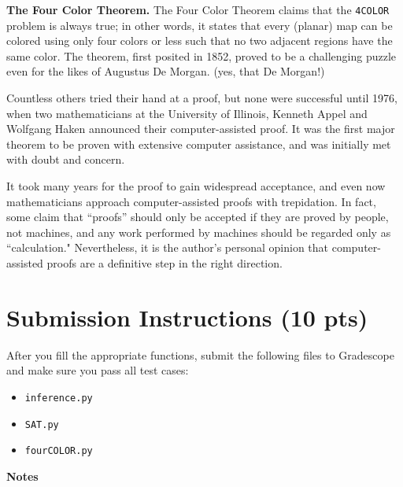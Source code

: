 \documentclass{article}
\begin{document}
    \begin{tcolorbox}[colback=green!10, phantom=\phantomsection\hypertarget{fct}]

        \textbf{The Four Color Theorem.}
        The Four Color Theorem claims that the \lstinline{4COLOR} problem is always true; in other words, it states that every (planar) map can be colored using only four colors or less such that no two adjacent regions have the same color. The theorem, first posited in 1852, proved to be a challenging puzzle even for the likes of Augustus De Morgan. (yes, that De Morgan!)

        \vspace{3mm}
        Countless others tried their hand at a proof, but none were successful until 1976, when two mathematicians at the University of Illinois, Kenneth Appel and Wolfgang Haken announced their computer-assisted proof.  It was the first major theorem to be proven with extensive computer assistance, and was initially met with doubt and concern.

        \vspace{3mm}
        It took many years for the proof to gain widespread acceptance, and even now mathematicians approach computer-assisted proofs with trepidation. In fact, some claim that ``proofs” should only be accepted if they are proved by people, not machines, and any work performed by machines should be regarded only as ``calculation." Nevertheless, it is the author's personal opinion that computer-assisted proofs are a definitive step in the right direction.
    \end{tcolorbox}

\section*{Submission Instructions (10 pts)}
    After you fill the appropriate functions, submit the following files to Gradescope and make sure you pass all test cases:
    \begin{itemize}
        \item \lstinline{inference.py}
        \item \lstinline{SAT.py}
        \item \lstinline{fourCOLOR.py}
    \end{itemize}

    \vspace{3mm}
    \textbf{Notes}
\end{document}
